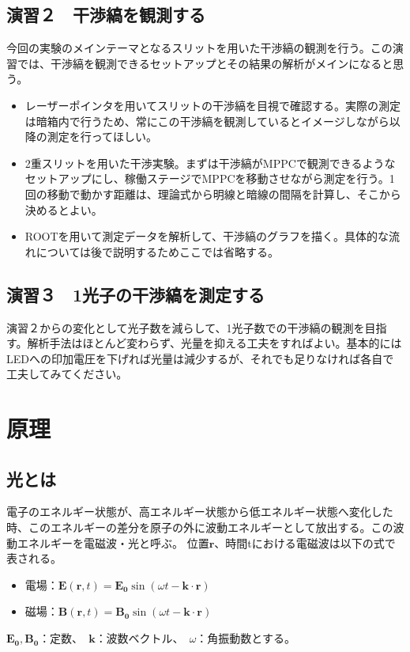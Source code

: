 \documentclass[10pt,a4j]{jarticle}
\begin{document}
\subsection{演習２　干渉縞を観測する}
今回の実験のメインテーマとなるスリットを用いた干渉縞の観測を行う。この演習では、干渉縞を観測できるセットアップとその結果の解析がメインになると思う。
\begin{itemize}
\item レーザーポインタを用いてスリットの干渉縞を目視で確認する。実際の測定は暗箱内で行うため、常にこの干渉縞を観測しているとイメージしながら以降の測定を行ってほしい。
\item 2重スリットを用いた干渉実験。まずは干渉縞がMPPCで観測できるようなセットアップにし、稼働ステージでMPPCを移動させながら測定を行う。1回の移動で動かす距離は、理論式から明線と暗線の間隔を計算し、そこから決めるとよい。
\item ROOTを用いて測定データを解析して、干渉縞のグラフを描く。具体的な流れについては後で説明するためここでは省略する。　
\end{itemize}

\subsection{演習３　1光子の干渉縞を測定する}
演習２からの変化として光子数を減らして、1光子数での干渉縞の観測を目指す。解析手法はほとんど変わらず、光量を抑える工夫をすればよい。基本的にはLEDへの印加電圧を下げれば光量は減少するが、それでも足りなければ各自で工夫してみてください。

\clearpage
\section{原理}

\subsection{光とは}
電子のエネルギー状態が、高エネルギー状態から低エネルギー状態へ変化した時、このエネルギーの差分を原子の外に波動エネルギーとして放出する。この波動エネルギーを電磁波・光と呼ぶ。
位置$\bm{r}$、時間tにおける電磁波は以下の式で表される。
\begin{itemize}
\item 電場：$\bm{E} (\bm{r}, t) = \bm{E_0} \sin (\omega t - \bm{k} \cdot \bm{r} ) $
\item 磁場：$\bm{B} (\bm{r}, t) = \bm{B_0} \sin (\omega t - \bm{k} \cdot \bm{r} ) $
\end{itemize}
$\bm{E_0}, \bm{B_0}$：定数、　$\bm{k}$：波数ベクトル、　$\omega$：角振動数とする。
\end{document}
